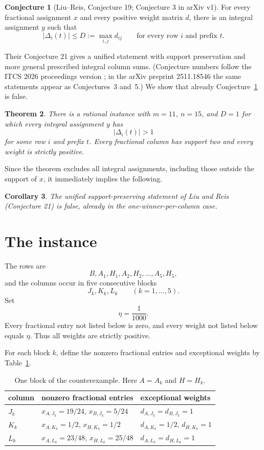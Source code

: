 \documentclass[11pt]{article}
\newtheorem{theorem}{Theorem}
\newtheorem{corollary}[theorem]{Corollary}
\theoremstyle{definition}
\newtheorem{conjecture}[theorem]{Conjecture}
\newcommand{\disc}{\Delta}
\begin{document}
\begin{conjecture}[Liu--Reis, Conjecture 19; Conjecture 3 in arXiv v1]\label{conj:machine}
For every fractional assignment $x$ and every positive weight matrix $d$,
there is an integral assignment $y$ such that
\[
 |\disc_i(t)|\le D:=\max_{i,j}d_{ij}
 \qquad\text{for every row $i$ and prefix $t$.}
\]
\end{conjecture}

Their Conjecture 21 gives a unified statement with support preservation and
more general prescribed integral column sums.  (Conjecture numbers follow the
ITCS 2026 proceedings version \citep{LiuReis2026}; in the arXiv preprint
2511.18546 the same statements appear as Conjectures~3 and~5.)  We show that
already Conjecture~\ref{conj:machine} is false.

\begin{theorem}\label{thm:main}
There is a rational instance with $m=11$, $n=15$, and $D=1$ for which every
integral assignment $y$ has
\[
 |\disc_i(t)|>1
\]
for some row $i$ and prefix $t$.  Every fractional column has support two and
every weight is strictly positive.
\end{theorem}

Since the theorem excludes all integral assignments, including those outside
the support of $x$, it immediately implies the following.

\begin{corollary}\label{cor:unified}
The unified support-preserving statement of Liu and Reis (Conjecture 21) is
false, already in the one-winner-per-column case.
\end{corollary}

\section{The instance}

The rows are
\[
 B,A_1,H_1,A_2,H_2,\ldots,A_5,H_5,
\]
and the columns occur in five consecutive blocks
\[
 J_k,K_k,L_k\qquad(k=1,\ldots,5).
\]
Set
\[
 \eta=\frac1{1000}.
\]
Every fractional entry not listed below is zero, and every weight not listed
below equals $\eta$.  Thus all weights are strictly positive.

For each block $k$, define the nonzero fractional entries and exceptional
weights by Table~\ref{tab:block}.

\begin{table}[ht]
\centering
\caption{One block of the counterexample.  Here $A=A_k$ and $H=H_k$.}
\label{tab:block}
\begin{tabular}{@{}lll@{}}
\toprule
column & nonzero fractional entries & exceptional weights \\
\midrule
$J_k$ & $x_{A,J_k}=19/24$, $x_{B,J_k}=5/24$
      & $d_{A,J_k}=d_{B,J_k}=1$ \\
$K_k$ & $x_{A,K_k}=1/2$, $x_{H,K_k}=1/2$
      & $d_{A,K_k}=1/2$, $d_{H,K_k}=1$ \\
$L_k$ & $x_{A,L_k}=23/48$, $x_{H,L_k}=25/48$
      & $d_{A,L_k}=d_{H,L_k}=1$ \\
\bottomrule
\end{tabular}
\end{table}
\end{document}
